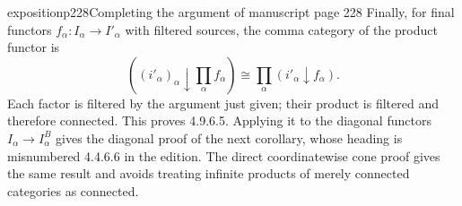 \begin{dcomment}{exposition}{p228}{Completing the argument of manuscript page 228}
Finally, for final functors $f_\alpha:I_\alpha\to I'_\alpha$ with filtered sources, the comma category of the product functor is
\[
 ((i'_\alpha)_\alpha\downarrow\prod_\alpha f_\alpha)
 \cong\prod_\alpha(i'_\alpha\downarrow f_\alpha).
\]
Each factor is filtered by the argument just given; their product is filtered and therefore connected. This proves 4.9.6.5. Applying it to the diagonal functors $I_\alpha\to I_\alpha^B$ gives the diagonal proof of the next corollary, whose heading is misnumbered 4.4.6.6 in the edition. The direct coordinatewise cone proof gives the same result and avoids treating infinite products of merely connected categories as connected.
\end{dcomment}
